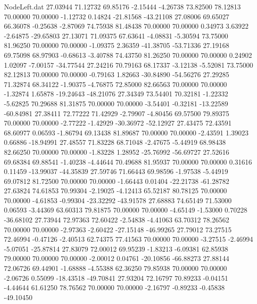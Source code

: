\begin{filecontents}{NodeLeft.dat}
  27.03944   71.12732   69.85176    -2.15444   -4.26738   73.82500   78.12813   70.00000   70.00000   -1.12732    0.14824  -21.81568  -43.21108
  27.08006   69.65027   66.36078    -0.25638   -2.87069   74.75938   81.48438   70.00000   70.00000    0.34973    3.63922   -2.64875  -29.65803
  27.13071   71.09375   67.63641    -4.08831   -5.30594   73.75000   81.96250   70.00000   70.00000   -1.09375    2.36359  -41.38705  -53.71336
  27.19168   69.75098   68.97903    -0.68613   -3.40788   74.43750   81.26250   70.00000   70.00000    0.24902    1.02097   -7.00157  -34.77544
  27.24216   70.79163   68.17337    -3.12138   -5.52081   73.75000   82.12813   70.00000   70.00000   -0.79163    1.82663  -30.84890  -54.56276
  27.29285   71.32874   68.34122    -1.90375   -4.76875   72.85000   82.66563   70.00000   70.00000   -1.32874    1.65878  -19.24643  -48.21076
  27.34349   73.54401   70.32181    -1.22332   -5.62825   70.29688   81.31875   70.00000   70.00000   -3.54401   -0.32181  -13.22589  -60.84981
  27.38411   72.77222   71.42929    -2.79907   -4.80456   69.57500   79.89375   70.00000   70.00000   -2.77222   -1.42929  -30.36972  -52.12927
  27.43475   72.43591   68.60977     0.06593   -1.86794   69.13438   81.89687   70.00000   70.00000   -2.43591    1.39023    0.66886  -18.94991
  27.48557   71.83228   68.71048    -2.47675   -5.44919   68.98438   82.66250   70.00000   70.00000   -1.83228    1.28952  -25.76992  -56.69727
  27.52616   69.68384   69.88541    -1.40238   -4.44644   70.49688   81.95937   70.00000   70.00000    0.31616    0.11459  -13.99037  -44.35839
  27.59746   71.66443   69.98596    -1.97538   -5.44919   69.07812   81.72500   70.00000   70.00000   -1.66443    0.01404  -22.21738  -61.28782
  27.63824   74.61853   70.99304    -2.19025   -4.12413   65.52187   80.78125   70.00000   70.00000   -4.61853   -0.99304  -23.32292  -43.91578
  27.68883   74.65149   71.53000     0.06593   -3.44369   63.60313   79.81875   70.00000   70.00000   -4.65149   -1.53000    0.70228  -36.68102
  27.73944   72.97363   72.60422    -2.54838   -4.41063   63.70312   78.26562   70.00000   70.00000   -2.97363   -2.60422  -27.15148  -46.99265
  27.79012   73.27515   72.46994    -0.47126   -2.40513   62.74375   77.41563   70.00000   70.00000   -3.27515   -2.46994   -5.07051  -25.87814
  27.83079   72.00012   69.95239    -1.83213   -6.09381   62.85938   79.00000   70.00000   70.00000   -2.00012    0.04761  -20.10856  -66.88273
  27.88144   72.06726   69.44901    -1.68888   -4.55388   62.36250   79.85938   70.00000   70.00000   -2.06726    0.55099  -18.43518  -49.70841
  27.93204   72.16797   70.89233    -0.04151   -4.44644   61.61250   78.76562   70.00000   70.00000   -2.16797   -0.89233   -0.45838  -49.10450

\end{filecontents}
